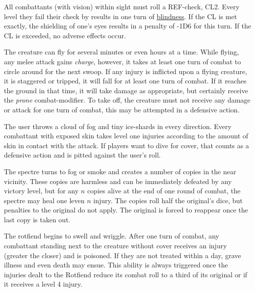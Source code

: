 {
    All combattants (with vision) within sight must roll a REF-check, CL2. Every level they fail their check by
    results in one turn of \hyperref[modifier:blindness]{blindness}. If the CL is met exactly, the shielding of one's eyes results in a penalty
    of -1D6 for this turn. If the CL is exceeded, no adverse effects occur.
}

{
    The creature can fly for several minutes or even hours at a time. While flying, any melee attack gains \textit{charge}, 
    however, it takes at least one turn of combat to circle around for the next swoop. If any injury is inflicted upon a 
    flying creature, it is staggered or tripped,
    it will fall for at least one turn of combat. If it reaches the ground in that time, it will take damage as appropriate,
    but certainly receive the \textit{prone} combat-modifier. To take off, the creature must not receive any damage
    or attack for one turn of combat, this may be attempted in a defensive action.
}

{
    The user throws a cloud of fog and tiny ice-shards in every direction.
    Every combattant with exposed skin takes level one injuries according to
    the amount of skin in contact with the attack. If players want to dive for
    cover, that counts as a defensive action and is pitted against the user's roll.
}

{
    The spectre turns to fog or smoke and creates a number of copies in the near vicinity. These
    copies are harmless and can be immediately defeated by any victory level, but for any $n$ copies
    alive at the end of one round of combat, the spectre may heal one leven $n$ injury. The copies
    roll half the original's dice, but penalties to the original do not apply. The original is forced
    to reappear once the last copy is taken out.
}

{
    The rotfiend begins to swell and wriggle. After one turn of combat, any combattant standing next to
    the creature without cover receives an injury (greater the closer) and is poisoned. If they are not
    treated within a day, grave illness and even death may ensue. This ability is always triggered once
    the injuries dealt to the Rotfiend reduce its combat roll to a third of its original or if it receives
    a level 4 injury.
}
